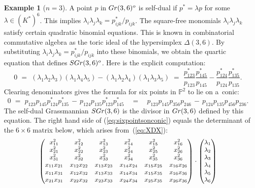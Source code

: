 \documentclass[12pt]{extarticle}
\theoremstyle{definition}
\newtheorem{example}[theorem]{Example}
\numberwithin{theorem}{section}
\theoremstyle{plain}\newtheorem{ithm}{Theorem}
\newcommand{\PP}{\mathbb{P}}
\begin{document}
\begin{example}[$n=3$] \label{ex:cca} A point $p$ in ${\rm Gr}(3,6)^o$ is self-dual if
$p^* = \lambda p$ for some $\lambda \in (K^*)^6$. This implies
$\lambda_i \lambda_j \lambda_k = p^*_{ijk}/ p_{ijk}$.
The square-free monomials $\lambda_i \lambda_j \lambda_k$
satisfy certain quadratic binomial equations. This is known 
in combinatorial commutative algebra as the 
toric ideal of the hypersimplex $\Delta(3,6) $.
By substituting $\lambda_i \lambda_j \lambda_k = p^*_{ijk}/ p_{ijk}$
into these binomials, we obtain the quartic
equation that defines ${\rm SGr}(3,6)^o$. Here is the explicit computation:
$$ 0 \,\, = \,\,
(\lambda_1 \lambda_2 \lambda_3) ( \lambda_1 \lambda_4 \lambda_5) -
(\lambda_1 \lambda_2 \lambda_4) ( \lambda_1 \lambda_3 \lambda_5) \,\,=\,\,
\frac{p^*_{123}}{p_{123}} \frac{p^*_{145}}{p_{145}} -
\frac{p^*_{124}}{p_{124}} \frac{p^*_{135}}{p_{135}} .
$$
Clearing denominators gives the formula
\cite[eqn~(3.4.9)]{AIT}
 for six points in $\PP^2$ to lie on a~conic:
\begin{equation}
\label{eq:sixpointsonconic} 
0 \,\, = \,\,
p_{123} p_{145} p^*_{124} p^*_{135}\, -\,
p_{124} p_{135} p^*_{123} p^*_{145} \quad = \quad
p_{123} p_{145} p_{356} p_{246} \, - \, p_{124} p_{135} p_{456} p_{236} .
\end{equation}
The self-dual Grassmannian 
${\rm SGr}(3,6)$ is the divisor in ${\rm Gr}(3,6)$ defined by this equation.
The right hand side of (\ref{eq:sixpointsonconic}) equals the
determinant of the $6 \times 6$ matrix below, which arises from~(\ref{eq:XDX}):
\begin{equation}
\label{eq:XDX2} \begin{small}
\begin{pmatrix}
x_{11}^2  & x_{12}^2  & x_{13}^2  & x_{14}^2  & x_{15}^2  & x_{16}^2  \\
x_{21}^2  & x_{22}^2  & x_{23}^2  & x_{24}^2  & x_{25}^2  & x_{26}^2  \\
x_{31}^2  & x_{32}^2  & x_{33}^2  & x_{34}^2  & x_{35}^2  & x_{36}^2  \\
x_{11} x_{21} & x_{12} x_{22} & x_{13} x_{23} & x_{14} x_{24} & x_{15} x_{25} & x_{16} x_{26} \\
x_{11} x_{31} & x_{12} x_{32} & x_{13} x_{33} & x_{14} x_{34} & x_{15} x_{35} & x_{16} x_{36} \\
x_{21} x_{31} & x_{22} x_{32} & x_{23} x_{33} & x_{24} x_{34} & x_{25} x_{35} & x_{26} x_{36} 
\end{pmatrix}
\cdot
\begin{pmatrix} \lambda_1 \\ \lambda_2 \\  \lambda_3 \\ \lambda_4 \\  \lambda_5 \\ \lambda_6 \end{pmatrix} 

\end{small}
\end{equation}
\end{example}
\end{document}
